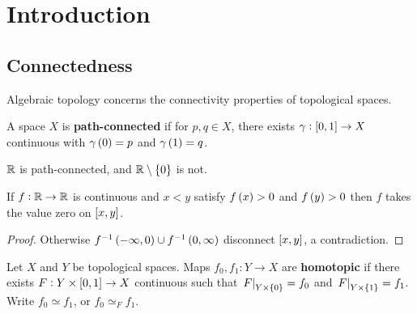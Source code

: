 \def\module{Algebraic Topology}
\def\lecturer{Prof Ivan Smith}
\def\term{Michaelmas 2020}
\def\cover{}
\def\syllabus{}
\def\thm{section}



\newcommand{\da}{\partial}
\newcommand{\ext}{\textstyle\bigwedge}
\newcommand{\Hc}{\H_{\ct}}
\newcommand{\pt}{\cbr{\text{point}}}





\section{Introduction}

\subsection{Connectedness}


Algebraic topology concerns the connectivity properties of topological spaces.

\begin{definition*}
A space $ X $ is \textbf{path-connected} if for $ p, q \in X $, there exists $ \gamma : \sbr{0, 1} \to X $ continuous with $ \gamma\br{0} = p $ and $ \gamma\br{1} = q $.
\end{definition*}

\begin{example*}
$ \mathbb{R} $ is path-connected, and $ \RR \setminus \cbr{0} $ is not.
\end{example*}

\begin{corollary}
If $ f : \mathbb{R} \to \mathbb{R} $ is continuous and $ x < y $ satisfy $ f\br{x} > 0 $ and $ f\br{y} > 0 $ then $ f $ takes the value zero on $ \sbr{x, y} $.
\end{corollary}

\begin{proof}
Otherwise $ f^{-1}\br{-\infty, 0} \cup f^{-1}\br{0, \infty} $ disconnect $ \sbr{x, y} $, a contradiction.
\end{proof}

\begin{definition*}
Let $ X $ and $ Y $ be topological spaces. Maps $ f_0, f_1 : Y \to X $ are \textbf{homotopic} if there exists $ F : Y \times \sbr{0, 1} \to X $ continuous such that $ \eval{F}_{Y \times \cbr{0}} = f_0 $ and $ \eval{F}_{Y \times \cbr{1}} = f_1 $. Write $ f_0 \simeq f_1 $, or $ f_0 \simeq_F f_1 $.
\end{definition*}

